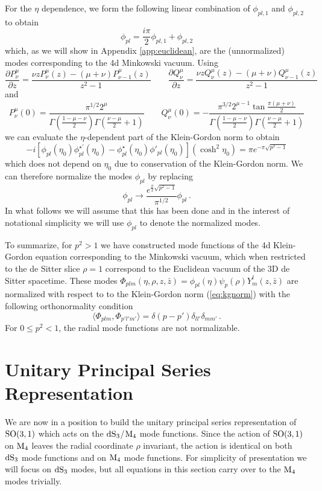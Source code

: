 \documentclass{brownthesis}
\begin{document}
For the $\eta$ dependence, we form the following linear combination
of $\phi_{pl,1}$ and $\phi_{pl,2}$ to obtain
\[
\phi_{pl}=\frac{i\pi}{2}\phi_{pl,1}+\phi_{pl,2}
\]
which, as we will show in Appendix \ref{app:euclidean}, are the (unnormalized)
modes corresponding to the 4d Minkowski vacuum. Using
\[
\frac{\partial P_{\nu}^{\mu}}{\partial z}=\frac{\nu zP_{\nu}^{\mu}(z)-(\mu+\nu)P_{\nu-1}^{\mu}(z)}{z^{2}-1}\qquad\frac{\partial Q_{\nu}^{\mu}}{\partial z}=\frac{\nu zQ_{\nu}^{\mu}(z)-(\mu+\nu)Q_{\nu-1}^{\mu}(z)}{z^{2}-1}
\]
and
\[
P_{\nu}^{\mu}(0)=\frac{\pi^{1/2}2^{\mu}}{\Gamma\left(\frac{1-\mu-\nu}{2}\right)\Gamma\left(\frac{\nu-\mu}{2}+1\right)}\qquad Q_{\nu}^{\mu}(0)=-\frac{\pi^{3/2}2^{\mu-1}\tan\frac{\pi(\mu+\nu)}{2}}{\Gamma\left(\frac{1-\mu-\nu}{2}\right)\Gamma\left(\frac{\nu-\mu}{2}+1\right)}
\]
we can evaluate the $\eta$-dependent part of the Klein-Gordon norm
to obtain
\[
-i[\phi_{pl}(\eta_{0})\phi_{pl}^{\star'}(\eta_{0})-\phi_{pl}^{\star}(\eta_{0})\phi'_{pl}(\eta_{0})](\cosh^{2}\eta_{0})=\pi e^{-\pi\sqrt{p^{2}-1}}
\]
which does not depend on $\eta_{0}$ due to conservation of the Klein-Gordon
norm. We can therefore normalize the modes $\phi_{pl}$ by replacing
\[
\phi_{pl}\to\frac{e^{\frac{\pi}{2}\sqrt{p^{2}-1}}}{\pi^{1/2}}\phi_{pl}\,.
\]
In what follows we will assume that this has been done and in the
interest of notational simplicity we will use $\phi_{pl}$ to denote
the normalized modes.

To summarize, for $p^{2}>1$ we have constructed mode functions of
the 4d Klein-Gordon equation corresponding to the Minkowski vacuum,
which when restricted to the de Sitter slice $\rho=1$ correspond
to the Euclidean vacuum of the 3D de Sitter spacetime. These modes
$\Phi_{plm}(\eta,\rho,z,\bar{z})=\phi_{pl}(\eta)\psi_{p}(\rho)Y_{m}^{l}(z,\bar{z})$
are normalized with respect to to the Klein-Gordon norm (\ref{eq:kgnorm})
with the following orthonormality condition
\[
\langle\Phi_{plm},\Phi_{p'l'm'}\rangle=\delta(p-p')\delta_{ll'}\delta_{mm'}\,.
\]
For $0\le p^{2}<1$, the radial mode functions are not normalizable.

\section{Unitary Principal Series Representation}

\label{sec:ups} We are now in a position to build the unitary principal
series representation of ${\rm SO(3,1)}$ which acts on the ${\rm dS_{3}}$/${\rm M_{4}}$
mode functions. Since the action of ${\rm SO(3,1)}$ on ${\rm M_{4}}$
leaves the radial coordinate $\rho$ invariant, the action is identical
on both ${\rm dS_{3}}$ mode functions and on ${\rm M_{4}}$ mode
functions. For simplicity of presentation we will focus on ${\rm dS_{3}}$
modes, but all equations in this section carry over to the ${\rm M_{4}}$
modes trivially.
\end{document}
